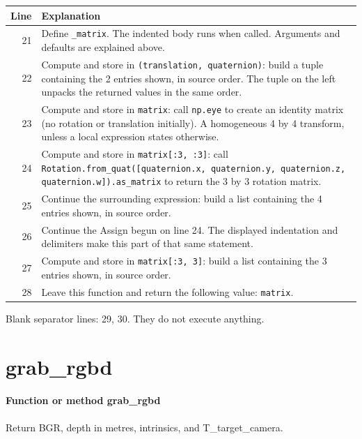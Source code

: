 \documentclass[11pt,a4paper]{book}
\begin{document}
\begin{longtable}{r p{}}

\textbf{Line} & \textbf{Explanation} \\ \hline \endhead

21 & Define \texttt{\_matrix}. The indented body runs when called. Arguments and defaults are explained above. \\

22 & Compute and store in \texttt{(translation, quaternion)}: build a tuple containing the 2 entries shown, in source order. The tuple on the left unpacks the returned values in the same order. \\

23 & Compute and store in \texttt{matrix}: call \texttt{np.eye} to create an identity matrix (no rotation or translation initially). A homogeneous 4 by 4 transform, unless a local expression states otherwise. \\

24 & Compute and store in \texttt{matrix[:3, :3]}: call \texttt{Rotation.from\_quat([quaternion.x, quaternion.y, quaternion.z, quaternion.w]).as\_matrix} to return the 3 by 3 rotation matrix.  \\

25 & Continue the surrounding expression: build a list containing the 4 entries shown, in source order. \\

26 & Continue the Assign begun on line 24. The displayed indentation and delimiters make this part of that same statement. \\

27 & Compute and store in \texttt{matrix[:3, 3]}: build a list containing the 3 entries shown, in source order.  \\

28 & Leave this function and return the following value: \texttt{matrix}. \\

\end{longtable}

Blank separator lines: 29, 30. They do not execute anything.

\section{grab\_rgbd}

\paragraph{Function or method grab\_rgbd}
Return BGR, depth in metres, intrinsics, and T\_target\_camera.
\end{document}
